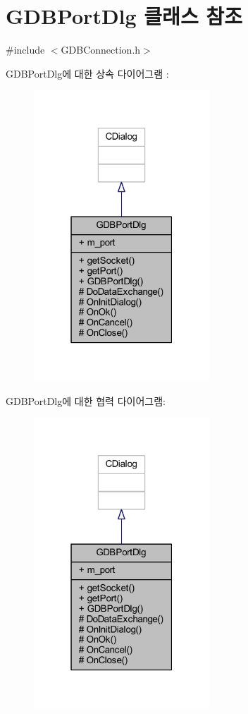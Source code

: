 \hypertarget{class_g_d_b_port_dlg}{}\section{G\+D\+B\+Port\+Dlg 클래스 참조}
\label{class_g_d_b_port_dlg}


{\ttfamily \#include $<$G\+D\+B\+Connection.\+h$>$}



G\+D\+B\+Port\+Dlg에 대한 상속 다이어그램 \+: \nopagebreak
\begin{figure}[H]
\begin{center}
\leavevmode
\includegraphics[width=187pt]{class_g_d_b_port_dlg__inherit__graph}
\end{center}
\end{figure}


G\+D\+B\+Port\+Dlg에 대한 협력 다이어그램\+:\nopagebreak
\begin{figure}[H]
\begin{center}
\leavevmode
\includegraphics[width=187pt]{class_g_d_b_port_dlg__coll__graph}
\end{center}
\end{figure}
